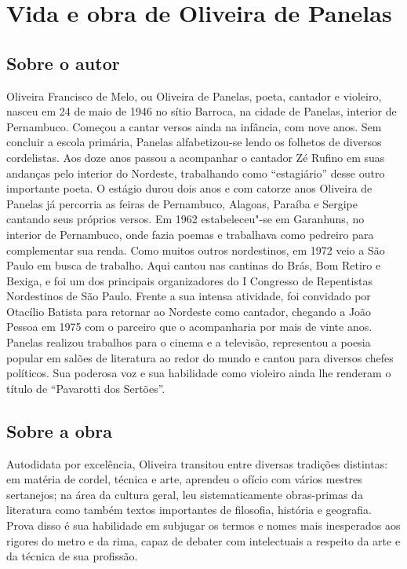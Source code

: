 \chapter{Vida e obra de Oliveira de Panelas}

\section{Sobre o autor}

Oliveira Francisco de Melo, ou Oliveira de Panelas, poeta, 
cantador e violeiro, nasceu em 24 de maio de 1946 no sítio 
Barroca, na cidade de Panelas, interior de Pernambuco. 
Começou a cantar versos ainda
na infância, com nove anos. Sem concluir a escola primária, Panelas
alfabetizou-se lendo os folhetos de diversos cordelistas. Aos doze anos
passou a acompanhar o cantador Zé Rufino em suas andanças pelo interior
do Nordeste, trabalhando como ``estagiário'' desse outro
importante poeta. O estágio durou dois anos e com catorze anos Oliveira de Panelas
já percorria
as feiras de Pernambuco, Alagoas, Paraíba e Sergipe cantando seus
próprios versos. Em 1962 estabeleceu"-se em Garanhuns, no interior
de Pernambuco, onde fazia poemas e trabalhava como pedreiro para
complementar sua renda. Como muitos outros nordestinos, em 1972 veio a
São Paulo em busca de trabalho. Aqui cantou nas cantinas do Brás, Bom
Retiro e Bexiga, e foi um dos principais organizadores do I Congresso
de Repentistas Nordestinos de São Paulo. Frente a sua intensa atividade,
foi convidado por Otacílio Batista para retornar ao Nordeste como
cantador, chegando a João Pessoa em 1975 com o parceiro que o
acompanharia por mais de vinte anos. Panelas realizou trabalhos para o
cinema e a televisão, representou a poesia popular em salões de
literatura ao redor do mundo e cantou para diversos chefes políticos.
Sua poderosa voz e sua habilidade como violeiro ainda lhe renderam o
título de ``Pavarotti dos Sertões''.


\section{Sobre a obra}

Autodidata por excelência, Oliveira transitou entre diversas tradições distintas:
em matéria de cordel, técnica e arte, aprendeu o ofício com vários mestres sertanejos; na área da cultura geral, leu sistematicamente obras-primas da literatura como também textos importantes de
filosofia, história e geografia. Prova disso é sua habilidade em subjugar os termos e nomes mais inesperados aos rigores do metro e da rima, capaz de
debater com intelectuais a respeito da arte e da técnica de
sua profissão.

